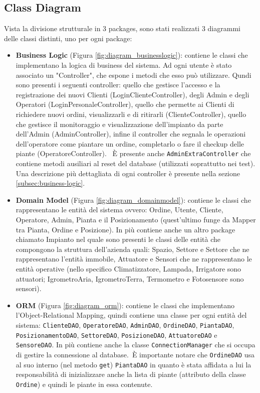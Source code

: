 \documentclass{article}
\newcommand{\code}[1]{\texttt{#1}}
\begin{document}
\subsection{Class Diagram}
Vista la divisione strutturale in 3 packages, sono stati realizzati 3 diagrammi delle classi distinti, uno per ogni package:

\begin{itemize}
    \item \textbf{Business Logic} (Figura \ref{fig:diagram_businesslogic}): contiene le classi che implementano la logica di business del sistema. Ad ogni utente è stato associato un "Controller", che espone i metodi che esso può utilizzare. Qundi sono presenti i seguenti controller: quello che gestisce l’accesso e la registrazione dei nuovi Clienti (LoginClienteController), degli Admin e degli Operatori (LoginPersonaleController), quello che permette ai Clienti di richiedere nuovi ordini, visualizzarli e di ritirarli (ClienteController), quello che gestisce il monitoraggio e visualizzazione dell'impianto da parte dell'Admin (AdminController), infine il controller che segnala le operazioni dell'operatore come piantare un ordine, completarlo o fare il checkup delle piante (OperatoreController). \
    È presente anche \code{AdminExtraController} che contiene metodi ausiliari al reset del database (utilizzati soprattutto nei test).\\
    Una descrizione più dettagliata di ogni controller è presente nella sezione \ref{subsec:business-logic}.
        
    
    \item \textbf{Domain Model} (Figura \ref{fig:diagram_domainmodel}): contiene le classi che rappresentano le entità del sistema ovvero: Ordine, Utente, Cliente, Operatore, Admin, Pianta e il Posizionamento (quest'ultimo funge da Mapper tra Pianta, Ordine e Posizione). In più contiene anche un altro package chiamato Impianto nel quale sono presenti le classi delle entità che compongono la struttura dell'azienda quali: Spazio, Settore e Settore che ne rappresentano l'entità immobile, Attuatore e Sensori che ne rappresentano le entità operative (nello specifico Climatizzatore, Lampada, Irrigatore sono attuatori; IgrometroAria, IgrometroTerra, Termometro e Fotosensore sono sensori).
        
    
    \item \textbf{ORM} (Figura \ref{fig:diagram_orm}): contiene le classi che implementano l’Object-Relational Mapping, quindi contiene una classe per ogni entità del sistema: \code{ClienteDAO}, \code{OperatoreDAO}, \code{AdminDAO}, \code{OrdineDAO}, \code{PiantaDAO}, \code{PosizionamentoDAO}, \code{SettoreDAO}, \code{PosizioneDAO}, \code{AttuatoreDAO} e \code{SensoreDAO}. In più contiene anche la classe \code{ConnectionManager} che si occupa di gestire la connessione al database.\
    È importante notare che \code{OrdineDAO} usa al suo interno (nel metodo \code{get}) \code{PiantaDAO} in quanto è stata affidata a lui la responsabilità di inizializzare anche la lista di piante (attributo della classe \code{Ordine}) e quindi le piante in essa contenute.
        
\end{itemize}
\end{document}
